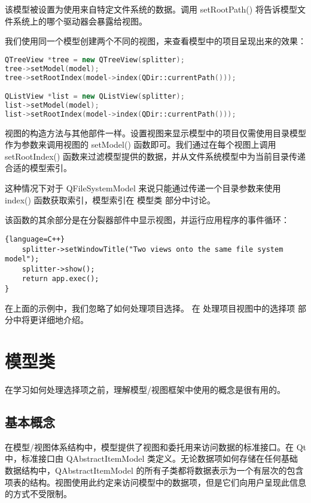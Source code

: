 该模型被设置为使用来自特定文件系统的数据。调用 setRootPath() 将告诉模型文件系统上的哪个驱动器会暴露给视图。

我们使用同一个模型创建两个不同的视图，来查看模型中的项目呈现出来的效果：

\begin{lstlisting}[language=C++]
QTreeView *tree = new QTreeView(splitter);
tree->setModel(model);
tree->setRootIndex(model->index(QDir::currentPath()));

QListView *list = new QListView(splitter);
list->setModel(model);
list->setRootIndex(model->index(QDir::currentPath()));
\end{lstlisting}

视图的构造方法与其他部件一样。设置视图来显示模型中的项目仅需使用目录模型作为参数来调用视图的 setModel() 函数即可。我们通过在每个视图上调用 setRootIndex() 函数来过滤模型提供的数据，并从文件系统模型中为当前目录传递合适的模型索引。

这种情况下对于 QFileSystemModel 来说只能通过传递一个目录参数来使用 index() 函数获取索引，模型索引在 模型类 部分中讨论。

该函数的其余部分是在分裂器部件中显示视图，并运行应用程序的事件循环：

\begin{lstlisting}{language=C++}
    splitter->setWindowTitle("Two views onto the same file system model");
    splitter->show();
    return app.exec();
}
\end{lstlisting}

在上面的示例中，我们忽略了如何处理项目选择。 在 处理项目视图中的选择项 部分中将更详细地介绍。

\section{模型类}

在学习如何处理选择项之前，理解模型/视图框架中使用的概念是很有用的。

\subsection{基本概念}

在模型/视图体系结构中，模型提供了视图和委托用来访问数据的标准接口。在 Qt 中，标准接口由 QAbstractItemModel 类定义。无论数据项如何存储在任何基础数据结构中，QAbstractItemModel 的所有子类都将数据表示为一个有层次的包含项表的结构。视图使用此约定来访问模型中的数据项，但是它们向用户呈现此信息的方式不受限制。


